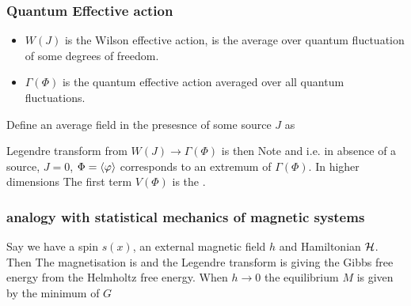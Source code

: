 \documentclass{article}
\begin{document}
\subsubsection*{Quantum Effective action}
\begin{itemize}
    \item $W(J)$ is the Wilson effective action, is the average over quantum fluctuation of some degrees of freedom. 
    \begin{example}
    \end{example}
    \item $\Gamma(\Phi)$ is the quantum effective action averaged over all quantum fluctuations. 
\end{itemize}

Define an average field in the presesnce of some source $J$ as 

Legendre transform from $W(J) \to \Gamma(\Phi)$ is then 
Note 
and 
i.e. in absence of a source, $J=0$, $\Phi=\braket{\varphi}$ corresponds to an extremum of $\Gamma(\Phi)$. In higher dimensions 
The first term $V(\Phi)$ is the . 

\subsubsection*{analogy with statistical mechanics of magnetic systems}
Say we have a spin $s(x)$, an external magnetic field $h$ and Hamiltonian $\mathcal{H}$. Then 
The magnetisation is 
and the Legendre transform is 
giving the Gibbs free energy from the Helmholtz free energy. When $h\to0$ the equilibrium $M$ is given by the minimum of $G$
\end{document}
